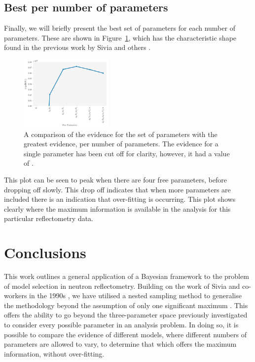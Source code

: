 \documentclass[
 reprint,
 superscriptaddress,
 amsmath,amssymb,
 aps,
]{revtex4-2}
\begin{document}
\subsection{Best per number of parameters}

Finally, we will briefly present the best set of parameters for each number of parameters. 
These are shown in Figure~\ref{fig:best_per}, which has the characteristic shape found in the previous work by Sivia and others \cite{sivia_analysis_1991,sivia_introduction_1993,sivia_bayesian_1998,sivia_data_2005}. 
%
\begin{figure}
\includegraphics[width=0.4\textwidth]{best_per}
\caption{\label{fig:best_per} A comparison of the evidence for the set of parameters with the greatest evidence, per number of parameters. The evidence for a single parameter has been cut off for clarity, however, it had a value of \protect.}
\end{figure}
%
This plot can be seen to peak when there are four free parameters, before dropping off slowly. 
This drop off indicates that when more parameters are included there is an indication that over-fitting is occurring. 
This plot shows clearly where the maximum information is available in the analysis for this particular reflectometry data. 

\section{\label{conclusions} Conclusions}

This work outlines a general application of a Bayesian framework to the problem of model selection in neutron reflectometry. 
Building on the work of Sivia and co-workers in the 1990s \cite{sivia_bayesian_1998}, we have utilised a nested sampling method to generalise the methodology beyond the assumption of only one significant maximum \cite{sivia_analysis_1991}. 
This offers the ability to go beyond the three-parameter space previously investigated to consider every possible parameter in an analysis problem.
In doing so, it is possible to compare the evidence of different models, where different numbers of parameters are allowed to vary, to determine that which offers the maximum information, without over-fitting. 
\end{document}
